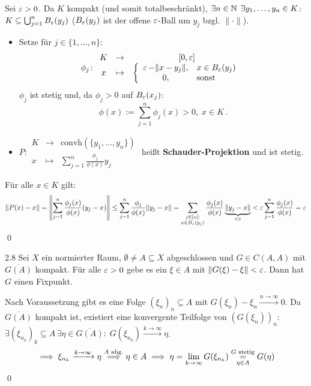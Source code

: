 \documentclass[a4paper]{article}
\begin{document}
\begin{Beweis}
Sei $\operatorname{\varepsilon}>0$. Da $K$ kompakt (und somit totalbeschränkt), $\exists n\in\operatorname{\mathbb N}\;\exists y_1,\ldots,y_n\in K$: $K\subseteq \bigcup_{j=1}^nB_{\operatorname{\varepsilon}}(y_j)$ ($B_{\operatorname{\varepsilon}}(y_j)$ ist der offene $\operatorname{\varepsilon}$-Ball um $y_j$ bzgl. $\|\cdot\|$). 
\begin{itemize}
\item Setze für $j\in\{1,\ldots,n\}$:
\[\phi_j\colon \begin{array}{clc}
K&\to &[0,\operatorname{\varepsilon}]\\
x&\mapsto& \left\{ \begin{array}{cl}
\operatorname{\varepsilon}-\|x-y_j\|,&x\in B_{\operatorname{\varepsilon}}(y_j)\\
0,&\text{sonst}
\end{array} \right.
\end{array}\]
$\phi_j$ ist stetig und, da $\phi_j>0$ auf $B_{\operatorname{\varepsilon}}(x_j)$:
\[\phi(x):=\sum_{j=1}^n\phi_j(x)>0,\;x\in K\,.\]
\item $P\colon \begin{array}{clc}
K&\to&\mathrm{convh}(\{y_1,\ldots,y_n\})\\
x&\mapsto& \sum_{j=1}^n\frac{\phi_j}{\phi(x)}y_j
\end{array} $ heißt \textbf{Schauder-Projektion} und ist stetig.
\end{itemize}
Für alle $x\in K$ gilt:
\begin{align*}
\|P(x)-x\|
=\left\|\sum_{j=1}^n\frac{\phi_j(x)}{\phi(x)}(y_j-x)\right\|
\le \sum_{j=1}^n\frac{\phi_j}{\phi(x)}\|y_j-x\|
=\sum_{\substack{j\in[n]:\\x\in B_{\operatorname{\varepsilon}}(y_j)}}\frac{\phi_j(x)}{\phi(x)}\underbrace{\|y_j-x\|}_{<\operatorname{\varepsilon}}
<\operatorname{\varepsilon} \sum_{j=1}^n\frac{\phi_j(x)}{\phi(x)}
=\operatorname{\varepsilon}
\end{align*}\qed
\end{Beweis}

\begin{Lemma}{}{2.8}
Sei $X$ ein normierter Raum, $\emptyset\ne A\subseteq X$ abgeschlossen und $G\in C(A,A)$ mit $\overline{G(A)}$ kompakt. Für alle $\operatorname{\varepsilon}>0$ gebe es ein $\xi\in A$ mit $\|G(\xi)-\xi\|<\operatorname{\varepsilon}$. Dann hat $G$ einen Fixpunkt. 
\end{Lemma}

\begin{Beweis}
Nach Voraussetzung gibt es eine Folge $(\xi_n)_n\subseteq A$ mit $G(\xi_n)-\xi_n\xrightarrow{n\to\infty}0$. Da $\overline{G(A)}$ kompakt ist, existiert eine konvergente Teilfolge von $(G(\xi_n))_n$: $\exists (\xi_{n_k})_k\subseteq A\,\exists \eta\in\overline{G(A)}:\;G(\xi_{n_k})\xrightarrow{k\to\infty}\eta$.
\[\implies \xi_{n_k}\xrightarrow{k\to\infty}\eta\overset{A\text{ abg.}}{\implies}\eta\in A\implies \eta=\lim_{k\to\infty}G(\xi_{n_k})\overset{G\text{ stetig}}{\underset{\eta\in A}{=}}G(\eta)\]\qed
\end{Beweis}
\end{document}
